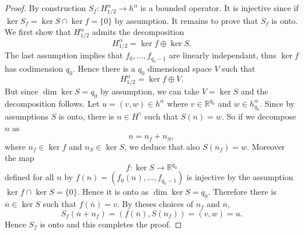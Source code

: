 \documentclass[12pt, openany]{amsart}
\theoremstyle{definition}
\theoremstyle{remark}
\theoremstyle{remark}
\theoremstyle{theorem}
\theoremstyle{theorem}
\theoremstyle{theorem}
\theoremstyle{theorem}
\newcommand{\RR}{\mathbb{R}}
\begin{document}
\begin{proof}
By construction $S_f:H^{\alpha}_{1/2}\to h^{\alpha}$ is a bounded operator. It is injective since if $\ker S_f = \ker S\cap\ker f = \{0\}$ by assumption. It remains to prove that $S_f$ is onto. We first show that $H^{\alpha}_{1/2}$ admits the decomposition 
\[
H^{\alpha}_{1/2} = \ker f\oplus\ker S.
\]
The last assumption implies that $f_0,\ldots,f_{q_0-1}$ are linearly independant, thus $\ker f$ has codimension $q_0$. Hence there is a $q_0$ dimensional space $V$ such that
\[
H^{\alpha}_{1/2} = \ker f\oplus V.
\]
But since $\dim \ker S=q_0$ by assumption, we can take $V=\ker S$ and the decomposition follows. Let $u = (v,w)\in h^{\alpha}$ where $v\in\RR^{q_0}$ and $w\in h^{\alpha}_{q_0}$. Since by assumptions $S$ is onto, there is $n\in H^{\gamma}$ such that $S(n) = w$. So if we decompose $n$ as
\[
n = n_f+n_S,
\]
where $n_f\in\ker f$ and $n_S\in \ker S$, we deduce that also $S(n_f) = w$. Moreover the map 
\[
f : \ker S\to\RR^{q_0}
\]
defined for all $n$ by $f(n) = (f_0(n),\ldots,f_{q_0-1})$ is injective by the assumption $\ker f\cap\ker S=\{0\}$. Hence it is onto as $\dim\ker S=q_0$. Therefore there is $\overline n\in\ker S$ such that $f(\overline n) = v$. By theses choices of $n_f$ and $\overline n$, 
\[
S_f(\overline n+n_f) = (f(\overline n), S(n_f))=(v,w) = u.
\]
Hence $S_f$ is onto and this completes the proof.
\end{proof}
\end{document}
